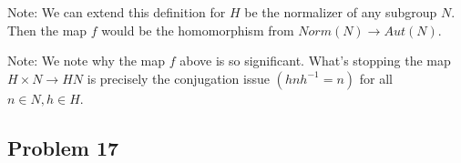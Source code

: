 \documentclass[12pt]{article}
\begin{document}
Note: We can extend this definition for $H$ be the normalizer of any subgroup $N$. Then the map $f$ would be the homomorphism from $Norm(N) \rightarrow Aut(N)$. \par

Note: We note why the map $f$ above is so significant. What's stopping the map $H \times N \rightarrow HN$ is precisely the conjugation issue $(hnh^{-1} = n)$ for all $n \in N, h \in H$.

\subsection*{Problem 17}
\end{document}
